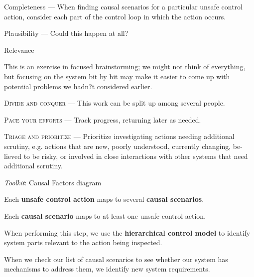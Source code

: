 \documentclass[letterpaper]{tufte-book}
\begin{document}
\begin{landscape}
\begin{multicols}{2}
\columnbreak


\begin{compactitem}
\item Completeness --- When finding causal scenarios for a particular unsafe control action, consider each part of the control loop in which the action occurs.
\item Plausibility --- Could this happen at all?
\item Relevance
\end{compactitem}


This is an exercise in focused brainstorming; we might not think of everything, but focusing on the system bit by bit may make it easier to come up with potential problems we hadn?t considered earlier.

\begin{compactitem}
\item \textsc{Divide and conquer} --- This work can be split up among several people.
\item \textsc{Pace your efforts} --- Track progress, returning later as needed.
\item \textsc{Triage and prioritize} --- Prioritize investigating actions needing additional scrutiny, e.g. actions that are new, poorly understood, currently changing, be-lieved to be risky, or involved in close interactions with other systems that need additional scrutiny.
\end{compactitem}  

\emph{Toolkit}: Causal Factors diagram


Each \textbf{unsafe control action} maps to several \textbf{causal scenarios}.

Each \textbf{causal scenario} maps to at least one unsafe control action.

When performing this step, we use the \textbf{hierarchical control model} to identify system parts relevant to the action being inspected.

When we check our list of causal scenarios to see whether our system has mechanisms to address them, we identify new system requirements.

\pagebreak

 

 
\end{multicols}
\end{landscape}
\end{document}
